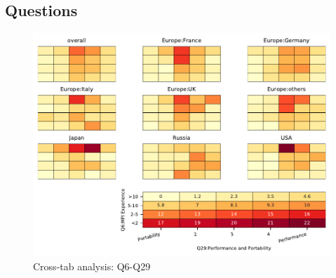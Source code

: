 
\subsection{Questions}


\begin{figure}
\begin{center}
\includegraphics[width=12cm]{../pdfs/Q6-Q29.pdf}
\caption{Cross-tab analysis: Q6-Q29}
\label{fig:Q6-Q29}
\end{center}
\end{figure}
